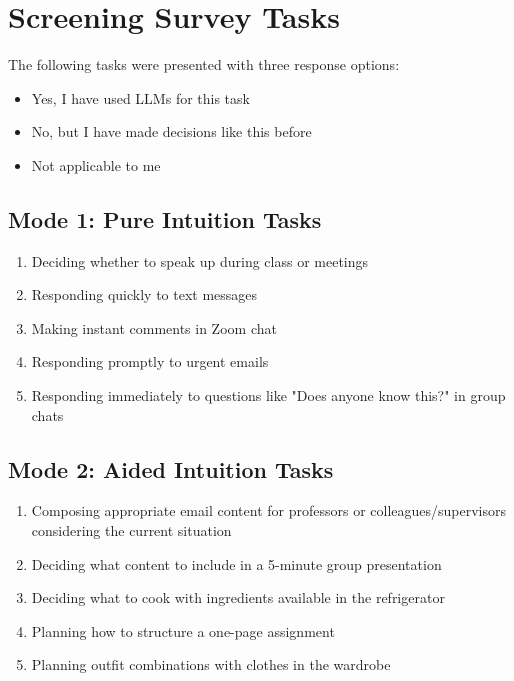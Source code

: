 \section{Screening Survey Tasks}\label{appendix:survey-tasks}
The following tasks were presented with three response options:
\begin{itemize}
    \item Yes, I have used LLMs for this task
    \item No, but I have made decisions like this before
    \item Not applicable to me
\end{itemize}

\subsection{Mode 1: Pure Intuition Tasks}
\begin{enumerate}
    \item Deciding whether to speak up during class or meetings
    \item Responding quickly to text messages
    \item Making instant comments in Zoom chat
    \item Responding promptly to urgent emails
    \item Responding immediately to questions like "Does anyone know this?" in group chats
\end{enumerate}

\subsection{Mode 2: Aided Intuition Tasks}
\begin{enumerate}
    \item Composing appropriate email content for professors or colleagues/supervisors considering the current situation
    \item Deciding what content to include in a 5-minute group presentation
    \item Deciding what to cook with ingredients available in the refrigerator
    \item Planning how to structure a one-page assignment
    \item Planning outfit combinations with clothes in the wardrobe
\end{enumerate}

